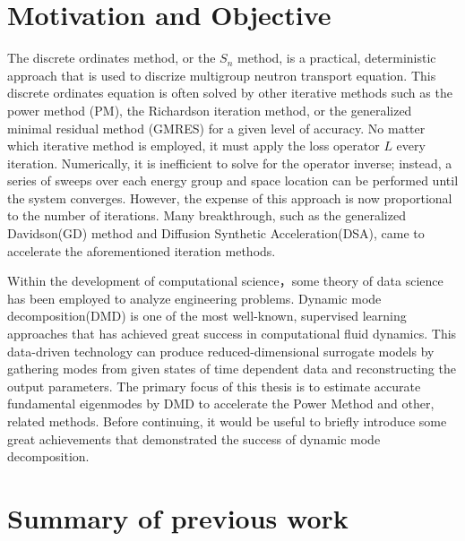 \section{Motivation and Objective}
The discrete ordinates method, or the $S_n$ method, is a practical, deterministic approach that is used to discrize multigroup neutron transport equation.
This discrete ordinates equation is often solved by other iterative methods such as the power method (PM), the Richardson iteration method\cite{adams1993two}, or the generalized minimal residual method (GMRES)\cite{saad1986gmres} for a given level of accuracy. 
No matter which iterative method is employed, it must apply the loss operator $L$ every iteration.
Numerically, it is inefficient to solve for the operator inverse; instead, a series of sweeps over each energy group and space location can be performed until the system converges.  
However, the expense of this approach is now proportional to the number of iterations.
Many breakthrough, such as the generalized Davidson(GD) method\cite{larsen1984diffusion} and Diffusion Synthetic Acceleration(DSA)\cite{hamilton2011numerical}, came to accelerate the aforementioned iteration methods.

Within the development of computational science，some theory of data science has been employed to analyze engineering problems.
Dynamic mode decomposition(DMD) is one of the most well-known, supervised learning approaches that has achieved great success in computational fluid dynamics.
This data-driven technology can produce reduced-dimensional surrogate models by gathering modes from given states of time dependent data and reconstructing the output parameters.
The primary focus of this thesis is to estimate accurate fundamental eigenmodes by DMD to accelerate the Power Method and other, related methods.
Before continuing, it would be useful to briefly introduce some great achievements that demonstrated the success of dynamic mode decomposition.

\section{Summary of previous work}

